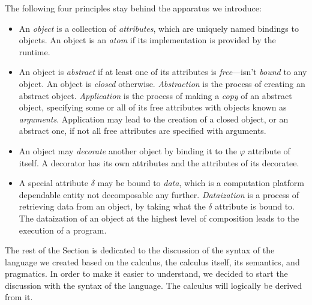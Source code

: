 The following four principles stay behind the
apparatus we introduce:

\begin{itemize}
\item An \emph{object} is a collection of \emph{attributes},
which are uniquely named bindings to objects. An object
is an \emph{atom} if its implementation is provided by the runtime.

\item An object is \emph{abstract} if at least one of its attributes
is \emph{free}---isn't \emph{bound} to any object. An object
is \emph{closed} otherwise.
\emph{Abstraction} is the process of creating an abstract object.
\emph{Application} is the process of making a \emph{copy} of an abstract
object, specifying some or all of its free attributes with
objects known as \emph{arguments}. Application may lead to the
creation of a closed object, or an abstract one, if not all free
attributes are specified with arguments.

\item An object may \emph{decorate} another object by binding it
to the $\varphi$ attribute of itself. A decorator has its
own attributes and the attributes of its decoratee.

\item A special attribute $\delta$ may be bound to \emph{data},
which is a computation platform dependable entity not
decomposable any further.
\emph{Dataization} is a process of retrieving data from an object,
by taking what the $\delta$ attribute is bound to.
The dataization of an object at the highest level of composition
leads to the execution of a program.
\end{itemize}

The rest of the Section is dedicated to the discussion of the
syntax of the language we created based on the calculus,
the calculus itself, its semantics, and pragmatics.
In order to make it easier to understand, we decided to start
the discussion with the syntax of the language. The calculus
will logically be derived from it.
